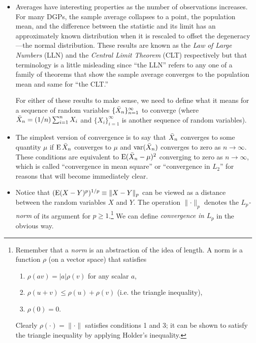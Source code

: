 \begin{itemize}[leftmargin=0pt]
\item Averages have interesting properties as the number of
  observations increases.  For many DGPs, the sample average collapses
  to a point, the population mean, and the difference between the
  statistic and its limit has an approximately known distribution when
  it is rescaled to offset the degeneracy---the normal distribution.
  These results are known as the \emph{Law of Large Numbers} (LLN) and
  the \emph{Central Limit Theorem} (CLT) respectively but that
  terminology is a little misleading since ``the LLN'' refers to any
  one of a family of theorems that show the sample average converges
  to the population mean and same for ``the CLT.''

  For either of these results to make sense, we need to define what it
  means for a sequence of random variables $\{\bar{X}_n\}_{n=1}^\infty$
  to converge (where $\bar{X}_n = (1/n) \sum_{i=1}^n X_i$ and
  $\{X_i\}_{i=1}^\infty$ is another sequence of random variables).

\item The simplest version of convergence is to say that $\bar{X}_n$
  converges to some quantity $\mu$ if $\operatorname{E} \bar{X}_n$ converges to $\mu$ and
  $\operatorname{var}(\bar{X}_n)$ converges to zero as $n \to \infty$.  These conditions are
  equivalent to $\operatorname{E}(\bar{X}_n - \mu)^2$ converging to zero as $n \to \infty$, which
  is called ``convergence in mean square'' or ``convergence in $L_2$''
  for reasons that will become immediately clear.

\item Notice that $(\operatorname{E}(X - Y)^p)^{1/p} \equiv \lVert X - Y \rVert_p$ can be
  viewed as a distance between the random variables $X$ and $Y$.  The
  operation $\lVert \cdot \rVert_p$ denotes the \emph{$L_p$-norm} of its
  argument for $p \geq 1$.\footnote{Remember that a \emph{norm} is an
    abstraction of the idea of length.  A norm is a function $\rho$ (on
    a vector space) that satisfies
    \begin{enumerate}
    \item $\rho(a v) = |a| \rho(v)$ for any scalar $a$,
    \item $\rho(u + v) \leq \rho(u) + \rho(v)$ (i.e. the triangle inequality),
    \item $\rho(0) = 0$.
    \end{enumerate}
    Clearly $\rho(\cdot) = \lVert \cdot \rVert$ satisfies conditions 1 and 3; it
    can be shown to satisfy the triangle inequality by applying
    Holder's inequality.}
  We can define \emph{convergence in $L_p$} in the obvious way.


\end{itemize}

